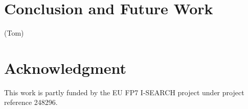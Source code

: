 \documentclass[runningheads,a4paper]{llncs} \usepackage[utf8]{inputenc}
\begin{document}
\section{Conclusion and Future Work}
(Tom)

\section{Acknowledgment}
This work is partly funded by the EU FP7 \mbox{I-SEARCH} project under project reference 248296.



\end{document}
